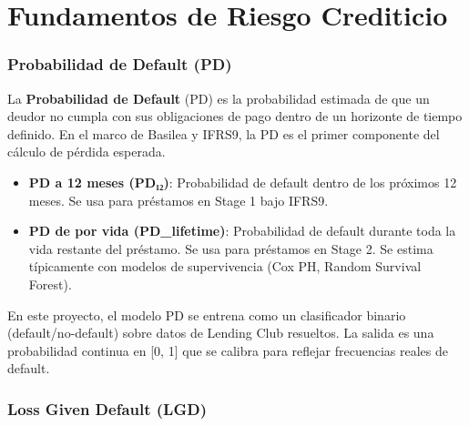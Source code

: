 \documentclass[
  spanish,
  11pt,
  letterpaper,
]{scrbook}
\providecommand{\tightlist}{%
  \setlength{\itemsep}{0pt}\setlength{\parskip}{0pt}}
\theoremstyle{plain}
\theoremstyle{remark}
\begin{document}
\chapter{Fundamentos de Riesgo
Crediticio}\label{sec-credit-risk-fundamentals}

\subsection{Probabilidad de Default
(PD)}\label{probabilidad-de-default-pd}

La \textbf{Probabilidad de Default} (PD) es la probabilidad estimada de
que un deudor no cumpla con sus obligaciones de pago dentro de un
horizonte de tiempo definido. En el marco de Basilea y IFRS9, la PD es
el primer componente del cálculo de pérdida esperada.

\begin{tcolorbox}[enhanced jigsaw, arc=.35mm, bottomrule=.15mm, bottomtitle=1mm, breakable, colback=white, colbacktitle=quarto-callout-note-color!10!white, colframe=quarto-callout-note-color-frame, coltitle=black, left=2mm, leftrule=.75mm, opacityback=0, opacitybacktitle=0.6, rightrule=.15mm, title=\textcolor{quarto-callout-note-color}{\faInfo}\hspace{0.5em}{PD a 12 meses vs PD de por vida}, titlerule=0mm, toprule=.15mm, toptitle=1mm]

\begin{itemize}
\tightlist
\item
  \textbf{PD a 12 meses (PD₁₂)}: Probabilidad de default dentro de los
  próximos 12 meses. Se usa para préstamos en Stage 1 bajo IFRS9.
\item
  \textbf{PD de por vida (PD\_lifetime)}: Probabilidad de default
  durante toda la vida restante del préstamo. Se usa para préstamos en
  Stage 2. Se estima típicamente con modelos de supervivencia (Cox PH,
  Random Survival Forest).
\end{itemize}

\end{tcolorbox}

En este proyecto, el modelo PD se entrena como un clasificador binario
(default/no-default) sobre datos de Lending Club resueltos. La salida es
una probabilidad continua en {[}0, 1{]} que se calibra para reflejar
frecuencias reales de default.

\subsection{Loss Given Default (LGD)}\label{loss-given-default-lgd}
\end{document}
